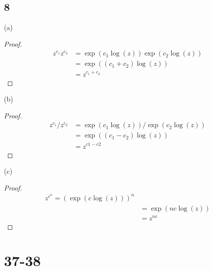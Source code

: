 \documentclass{article}
\begin{document}
\subsection*{8} %
(a) \begin{proof}
    \begin{align*}
        z^{c_1}z^{c_2} & = \exp(c_1\log(z))\exp(c_2\log(z)) \\
                       & = \exp((c_1+c_2)\log(z))           \\
                       & = z^{c_1+c_2}
    \end{align*}
\end{proof}
(b) \begin{proof}
    \begin{align*}
        z^{c_1}/z^{c_2} & = \exp(c_1\log(z))/\exp(c_2\log(z)) \\
                        & = \exp((c_1-c_2)\log(z))            \\
                        & = z^{c1-c2}
    \end{align*}
\end{proof}
(c) \begin{proof}
    \begin{align*}
        z^{c^n} = (\exp(c\log(z)))^n \\
         & = \exp(nc\log(z))         \\
         & = z^{nc}
    \end{align*}
\end{proof}
\section*{37-38}
\end{document}

